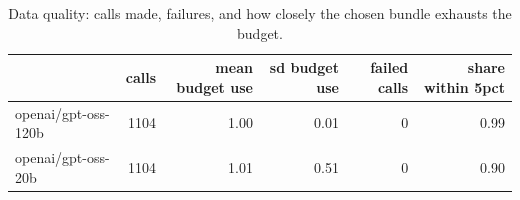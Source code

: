 \begin{table}[!htbp]\centering\small
\caption{Data quality: calls made, failures, and how closely the chosen bundle exhausts the budget.}\label{tab:data_quality}
\begin{tabular}{lrrrrr}
\hline
 & calls & mean budget use & sd budget use & failed calls & share within 5pct \\ \hline
openai/gpt-oss-120b & 1104 & 1.00 & 0.01 & 0 & 0.99 \\
openai/gpt-oss-20b & 1104 & 1.01 & 0.51 & 0 & 0.90 \\
\hline
\end{tabular}
\end{table}